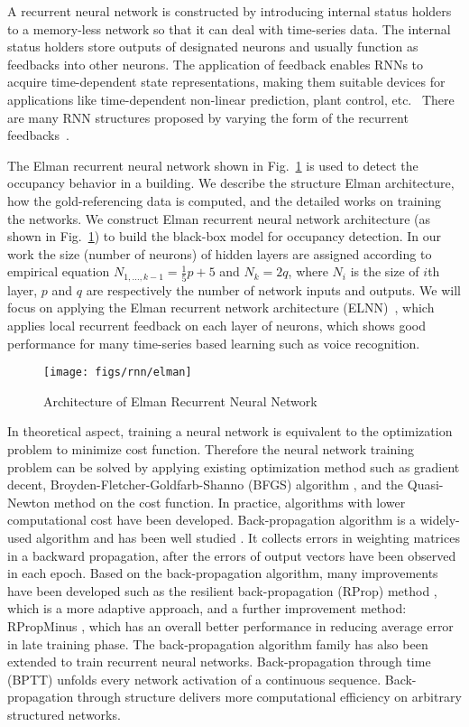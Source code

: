 A recurrent neural network is constructed by introducing
internal status holders to a memory-less network so that it can deal
with time-series data. The internal status holders store outputs of
designated neurons and usually function as feedbacks into other
neurons. The application of feedback enables RNNs to acquire
time-dependent state representations, making them suitable devices for
applications like time-dependent non-linear prediction, plant control,
etc.~\cite{haykin2004compreh} There are many RNN structures
proposed by varying the form of the recurrent
feedbacks~\cite{elman1990finding,haykin2004compreh,puskorius1996dynamic}.

The Elman recurrent neural network shown in
Fig.~\ref{fig:elman} is used to detect the occupancy behavior in a building.
We describe the structure Elman architecture, how the gold-referencing data is
computed, and the detailed works on training the networks. We construct Elman recurrent neural network architecture (as shown in Fig.~\ref{fig:elman}) to build the black-box model for occupancy detection. In
our work the size (number of neurons) of hidden layers are assigned according
to empirical equation $N_{1,\ldots,k-1}=\frac15p+5$ and $N_k=2q$, where $N_i$
is the size of $i$th layer, $p$ and $q$ are respectively the number of network
inputs and outputs. We will focus on applying the Elman recurrent network
architecture (ELNN)~\cite{elman1990finding}, which applies local
recurrent feedback on each layer of neurons, which shows good
performance for many time-series based learning such as voice
recognition.

\begin{figure}[t]
    \centering
    \texttt{[image: figs/rnn/elman]}
    \caption{Architecture of Elman Recurrent Neural Network}
    \label{fig:elman}
\end{figure}


In theoretical aspect, training a neural network is equivalent to the optimization problem to minimize cost function. Therefore the neural network training problem can be solved by applying existing optimization method such as gradient decent, Broyden-Fletcher-Goldfarb-Shanno (BFGS) algorithm
\cite{heath2010sci}, and the Quasi-Newton method on the cost function. In
practice, algorithms with lower computational cost have been developed.
Back-propagation algorithm is a widely-used algorithm and has been well studied
\cite{hecht1988backprop}. It collects errors in weighting matrices in a
backward propagation, after the errors of output vectors have been observed in
each epoch. Based on the back-propagation algorithm, many improvements have
been developed such as the resilient back-propagation (RProp) method
\cite{riedmiller1993direct}, which is a more adaptive approach, and a further
improvement method: RPropMinus \cite{igel2003empirical}, which has an overall
better performance in reducing average error in late training phase. The
back-propagation algorithm family has also been extended to train recurrent
neural networks. Back-propagation through time (BPTT) \cite{werbos1990backprop}
unfolds every network activation of a continuous sequence. Back-propagation
through structure delivers more computational efficiency on arbitrary
structured networks.
